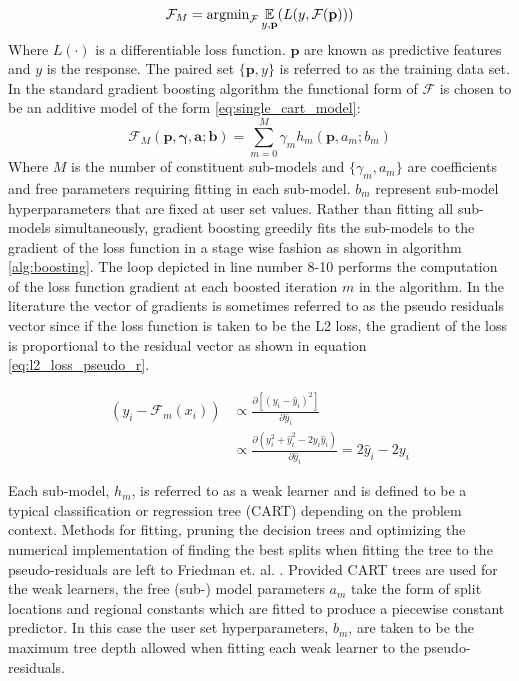 \begin{equation}
\mathcal F_M = \text{argmin}_{\mathcal F} \operatorname*{\mathbb{E}}_{y, \mathbf p} (L(y, \mathcal F(\mathbf p)))
\label{eq:boosting_problem}
\end{equation}
Where $L(\cdot)$ is a differentiable loss function.  $\mathbf p$ are known as predictive features and $y$ is the response.  The paired set $\{\mathbf p, y \}$ is referred to as the training data set.  In the standard gradient boosting algorithm the functional form of $\mathcal F$ is chosen to be an additive model of the form \ref{eq:single_cart_model}:
\begin{equation}
\mathcal F_M(\mathbf p, \mathbf{\gamma}, \mathbf a; \mathbf b) = \sum_{m=0}^M \gamma_m h_m(\mathbf p, a_m; b_m)
\label{eq:single_cart_model}
\end{equation}
Where $M$ is the number of constituent sub-models and $\{\gamma_m, a_m\}$ are coefficients and free parameters requiring fitting in each sub-model.  $b_m$ represent sub-model hyperparameters that are fixed at user set values.
Rather than fitting all sub-models simultaneously,
gradient boosting greedily fits the sub-models to the gradient of the loss function in a stage wise fashion as shown in algorithm \ref{alg:boosting}.  The loop depicted in line number 8-10 performs the computation of the loss function gradient at each boosted iteration $m$ in the algorithm.  In the literature the vector of gradients is sometimes referred to as the pseudo residuals vector since if the loss function is taken to be the L2 loss, the gradient of the loss is proportional to the residual vector as shown in equation \ref{eq:l2_loss_pseudo_r}.

\begin{align}
    (y_i - \mathcal F_{m}(x_i)) & \propto \frac{\partial [(y_i - \hat y_i)^2]}{\partial \hat y_i} \nonumber \\
     & \propto \frac{\partial (y_i^2 + \hat y_i^2 - 2y_i \hat y_i)}{\partial \hat y_i} = 2 \hat y_i - 2 y_i
    \label{eq:l2_loss_pseudo_r}
\end{align}

Each sub-model, $h_m$, is referred to as a weak learner and is defined to be a typical classification or regression tree (CART) depending on the problem context.  Methods for fitting, pruning the decision trees and optimizing the numerical implementation of finding the best splits when fitting the tree to the pseudo-residuals are left to Friedman et. al. \cite{friedman2002}.  Provided CART trees are used for the weak learners, the free (sub-) model parameters $a_m$ take the form of split locations and regional constants which are fitted to produce a piecewise constant predictor.  In this case the user set hyperparameters, $b_m$, are taken to be the maximum tree depth allowed when fitting each weak learner to the pseudo-residuals.

